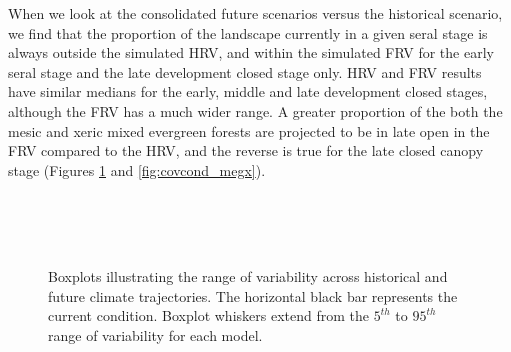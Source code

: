 When we look at the consolidated future scenarios versus the historical scenario, we find that the proportion of the landscape currently in a given seral stage is always outside the simulated HRV, and within the simulated FRV for the early seral stage and the late development closed stage only. HRV and FRV results have similar medians for the early, middle and late development closed stages, although the FRV has a much wider range. A greater proportion of the both the mesic and xeric mixed evergreen forests are projected to be in late open in the FRV compared to the HRV, and the reverse is true for the late closed canopy stage (Figures \ref{fig:covcond_megm} and \ref{fig:covcond_megx}).

\begin{figure}[htbp]
  \centering
  \qquad
   \\
  \qquad
   \\
       \\
  \qquad
    \qquad
    \caption{Boxplots illustrating the range of variability across historical and future climate trajectories. The horizontal black bar represents the current condition. Boxplot whiskers extend from the $5^{th}$ to $95^{th}$ range of variability for each model. }
  \label{fig:covcond_megm} %
\end{figure} %

